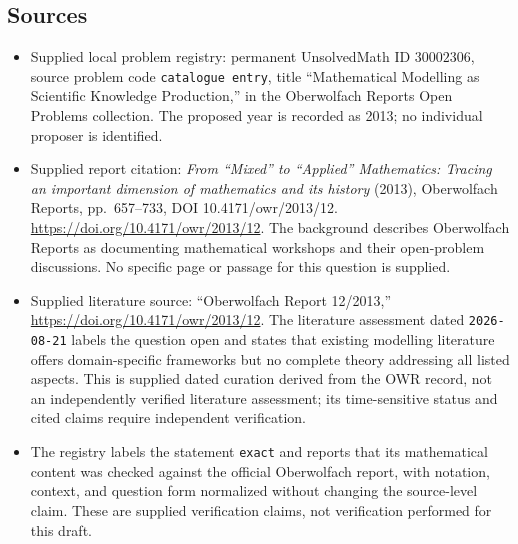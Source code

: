 \documentclass[11pt]{article}
\begin{document}
\subsection{Sources}
\begin{itemize}
\item Supplied local problem registry: permanent UnsolvedMath ID \(30002306\), source problem code \texttt{catalogue entry}, title ``Mathematical Modelling as Scientific Knowledge Production,'' in the Oberwolfach Reports Open Problems collection. The proposed year is recorded as 2013; no individual proposer is identified.
\item Supplied report citation: \emph{From ``Mixed'' to ``Applied'' Mathematics: Tracing an important dimension of mathematics and its history} (2013), Oberwolfach Reports, pp.~657--733, DOI 10.4171/owr/2013/12. \url{https://doi.org/10.4171/owr/2013/12}. The background describes Oberwolfach Reports as documenting mathematical workshops and their open-problem discussions. No specific page or passage for this question is supplied.
\item Supplied literature source: ``Oberwolfach Report 12/2013,'' \url{https://doi.org/10.4171/owr/2013/12}. The literature assessment dated \texttt{2026-08-21} labels the question open and states that existing modelling literature offers domain-specific frameworks but no complete theory addressing all listed aspects. This is supplied dated curation derived from the OWR record, not an independently verified literature assessment; its time-sensitive status and cited claims require independent verification.
\item The registry labels the statement \texttt{exact} and reports that its mathematical content was checked against the official Oberwolfach report, with notation, context, and question form normalized without changing the source-level claim. These are supplied verification claims, not verification performed for this draft.
\end{itemize}
\end{document}
